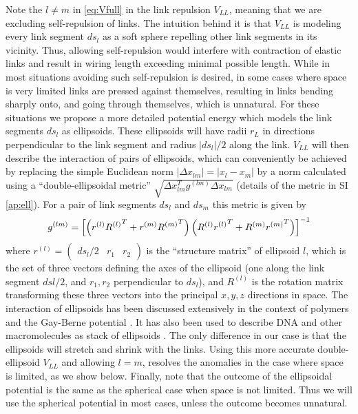 \documentclass[nofootinbib,preprint,floatfix,titlepage,endfloats]{revtex4} %
\begin{document}
Note the $l\ne m $ in \eqref{eq:Vfull} in the link repulsion $V_{LL}$, meaning that we are excluding self-repulsion of links. 
The intuition behind it is that $V_{LL}$ is modeling every link segment $ds_l$ as a soft sphere repelling other link segments in its vicinity.
Thus, allowing self-repulsion would interfere with contraction of elastic links and result in wiring length exceeding minimal possible length. 
While in most situations avoiding such self-repulsion is desired, in some cases where space is very limited links are pressed against themselves, resulting in  links bending sharply onto, and going through themselves, which is unnatural. 
For these situations we propose a more detailed potential energy which models the link segments $ds_l$ as ellipsoids. These ellipsoids will have radii $r_L$ in directions perpendicular to the link segment and radius $|ds_l|/2$ along the link. 
$V_{LL}$ will then describe the interaction of pairs of ellipsoids, which can conveniently be achieved by replacing the simple Euclidean norm $|\Delta x_{lm}| = |x_l-x_m|%
$ by a norm calculated using a ``double-ellipsoidal metric'' $\sqrt{\Delta x_{lm}^Tg^{(lm)}\Delta x_{lm}}$ (details of the metric in SI \ref{ap:ell}). 
For a pair of link segments $ds_l$ and $ds_m$ this metric is given by 
\begin{align}
    g^{(lm)} = \left[\left(r^{(l)}{R^{(l)}}^T+ r^{(m)}{R^{(m)}}^T\right) \left(R^{(l)}{r^{(l)}}^T+ R^{(m)}{r^{(m)}}^T\right) \right]^{-1}
    \label{eq:g-ell}
\end{align}
where $r^{(l)} = \left(\begin{array}{c|c|c}ds_l/2 & r_{1} &r_{2}\end{array}
    \right)$ 
is the ``structure matrix'' of ellipsoid $l$, which is the set of three vectors defining the axes of the ellipsoid (one along the link segment $dsl/2$, and $r_1, r_2$ perpendicular to $ds_l$), and $R^{(l)}$ is the rotation matrix transforming these three vectors into the principal $x,y,z$ directions in space. 
The interaction of ellipsoids has been discussed extensively in the context of polymers and the Gay-Berne potential \citep{gay1981modification,berne1972gaussian,everaers2003interaction}. 
It has also been used to describe DNA and other macromolecules as stack of ellipsoids \citep{babadi2006coarse,mergell2003modeling,cleaver1996extension}.
The only difference in our case is that the ellipsoids will stretch and shrink with the links. 
Using this more accurate double-ellipsoid $V_{LL}$ and allowing $l=m$, resolves the anomalies in the case where space is limited, as we show below. 
Finally, note that the outcome of the ellipsoidal potential is the same as the spherical case when space is not limited. 
Thus we will use the spherical potential in most cases, unless the outcome becomes unnatural.   
\end{document}
